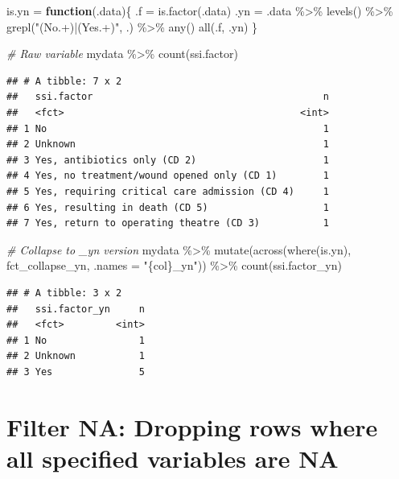\documentclass[
]{book}
\newenvironment{Shaded}{\begin{snugshade}}{\end{snugshade}}
\newcommand{\AttributeTok}[1]{\textcolor[rgb]{0.77,0.63,0.00}{#1}}
\newcommand{\CommentTok}[1]{\textcolor[rgb]{0.56,0.35,0.01}{\textit{#1}}}
\newcommand{\ControlFlowTok}[1]{\textcolor[rgb]{0.13,0.29,0.53}{\textbf{#1}}}
\newcommand{\FunctionTok}[1]{\textcolor[rgb]{0.00,0.00,0.00}{#1}}
\newcommand{\NormalTok}[1]{#1}
\newcommand{\OtherTok}[1]{\textcolor[rgb]{0.56,0.35,0.01}{#1}}
\newcommand{\SpecialCharTok}[1]{\textcolor[rgb]{0.00,0.00,0.00}{#1}}
\newcommand{\StringTok}[1]{\textcolor[rgb]{0.31,0.60,0.02}{#1}}
\begin{document}
\begin{Shaded}
\begin{Highlighting}[]
\NormalTok{is.yn }\OtherTok{=} \ControlFlowTok{function}\NormalTok{(.data)\{}
\NormalTok{  .f }\OtherTok{=} \FunctionTok{is.factor}\NormalTok{(.data)}
\NormalTok{  .yn }\OtherTok{=}\NormalTok{ .data }\SpecialCharTok{\%\textgreater{}\%} 
    \FunctionTok{levels}\NormalTok{() }\SpecialCharTok{\%\textgreater{}\%} 
    \FunctionTok{grepl}\NormalTok{(}\StringTok{"(No.+)|(Yes.+)"}\NormalTok{, .) }\SpecialCharTok{\%\textgreater{}\%} 
    \FunctionTok{any}\NormalTok{()}
  \FunctionTok{all}\NormalTok{(.f, .yn)}
\NormalTok{\}}

\CommentTok{\# Raw variable}
\NormalTok{mydata }\SpecialCharTok{\%\textgreater{}\%} 
  \FunctionTok{count}\NormalTok{(ssi.factor)}
\end{Highlighting}
\end{Shaded}

\begin{verbatim}
## # A tibble: 7 x 2
##   ssi.factor                                        n
##   <fct>                                         <int>
## 1 No                                                1
## 2 Unknown                                           1
## 3 Yes, antibiotics only (CD 2)                      1
## 4 Yes, no treatment/wound opened only (CD 1)        1
## 5 Yes, requiring critical care admission (CD 4)     1
## 6 Yes, resulting in death (CD 5)                    1
## 7 Yes, return to operating theatre (CD 3)           1
\end{verbatim}

\begin{Shaded}
\begin{Highlighting}[]
\CommentTok{\# Collapse to \_yn version}
\NormalTok{mydata }\SpecialCharTok{\%\textgreater{}\%} 
  \FunctionTok{mutate}\NormalTok{(}\FunctionTok{across}\NormalTok{(}\FunctionTok{where}\NormalTok{(is.yn), fct\_collapse\_yn, }\AttributeTok{.names =} \StringTok{"\{col\}\_yn"}\NormalTok{)) }\SpecialCharTok{\%\textgreater{}\%} 
  \FunctionTok{count}\NormalTok{(ssi.factor\_yn)}
\end{Highlighting}
\end{Shaded}

\begin{verbatim}
## # A tibble: 3 x 2
##   ssi.factor_yn     n
##   <fct>         <int>
## 1 No                1
## 2 Unknown           1
## 3 Yes               5
\end{verbatim}

\hypertarget{filter-na-dropping-rows-where-all-specified-variables-are-na}{%
\section{Filter NA: Dropping rows where all specified variables are NA}\label{filter-na-dropping-rows-where-all-specified-variables-are-na}}
\end{document}
